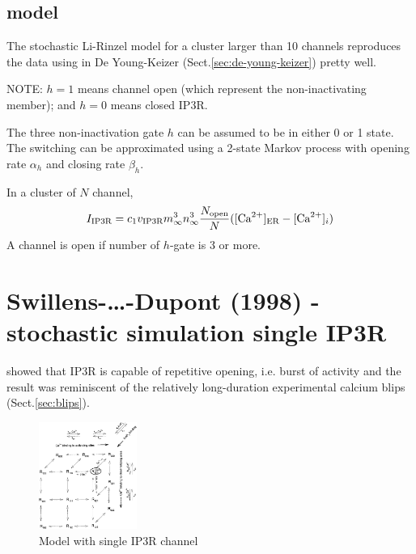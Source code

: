 \subsection{model}

The stochastic Li-Rinzel model for a cluster larger than 10 channels reproduces
the data using in De Young-Keizer (Sect.\ref{sec:de-young-keizer}) pretty well.

NOTE: $h=1$ means channel open (which represent the non-inactivating member);
and $h=0$ means closed IP3R.

The three non-inactivation gate $h$ can be assumed to be in either 0 or 1 state.
The switching can be approximated using a 2-state Markov process with opening
rate $\alpha_h$ and closing rate $\beta_h$.

In a cluster of $N$ channel, 
\begin{equation}
I_\text{IP3R} = c_1 v_\text{IP3R} m_\infty^3 n_\infty^3
\frac{N_{\text{open}}}{N}([{\text{Ca}^{2+}}]_{\text{ER}} - [{\text{Ca}^{2+}}]_i)
\end{equation}
A channel is open if number of $h$-gate is 3 or more.

\section{Swillens-\ldots-Dupont (1998) - stochastic simulation single IP3R}
\label{sec:Swillens_1998_singleIP3R}

\citep{swillen1998sss} showed that IP3R is capable of repetitive opening, i.e.
burst of activity and the result was reminiscent of the relatively long-duration
experimental calcium blips (Sect.\ref{sec:blips}).

\begin{figure}[hbt]
 \centerline{\includegraphics[height=3.5cm]{./images/IP3R-Swillens-Dupont-1998.eps}}
\caption{Model with single IP3R channel}
\label{fig:IP3R-Swillens-Dupont-1998}
\end{figure}


